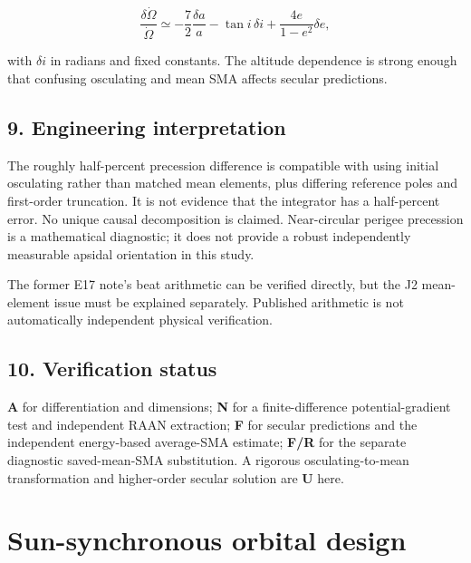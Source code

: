 \documentclass[10pt,a4paper]{article}
\numberwithin{equation}{section}
\begin{document}
\begin{equation}\frac{\delta\dot\Omega}{\dot\Omega}\simeq
-\frac72\frac{\delta a}{a}-\tan i\,\delta i+
\frac{4e}{1-e^2}\delta e,\label{eq:ch3-17}\end{equation}

\begin{sloppypar}with \(\delta i\) in radians and fixed constants. The altitude dependence is strong enough that confusing osculating and mean SMA affects secular predictions.\end{sloppypar}


\subsection*{9. Engineering interpretation}
\begin{sloppypar}The roughly half-percent precession difference is compatible with using initial osculating rather than matched mean elements, plus differing reference poles and first-order truncation. It is not evidence that the integrator has a half-percent error. No unique causal decomposition is claimed. Near-circular perigee precession is a mathematical diagnostic; it does not provide a robust independently measurable apsidal orientation in this study.\end{sloppypar}


\begin{sloppypar}The former E17 note's beat arithmetic can be verified directly, but the J2 mean-element issue must be explained separately. Published arithmetic is not automatically independent physical verification.\end{sloppypar}


\subsection*{10. Verification status}
\begin{sloppypar}\textbf{A} for differentiation and dimensions; \textbf{N} for a finite-difference potential-gradient test and independent RAAN extraction; \textbf{F} for secular predictions and the independent energy-based average-SMA estimate; \textbf{F/R} for the separate diagnostic saved-mean-SMA substitution. A rigorous osculating-to-mean transformation and higher-order secular solution are \textbf{U} here.\end{sloppypar}


\clearpage\section{Sun-synchronous orbital design}\label{ch:4}
\end{document}
